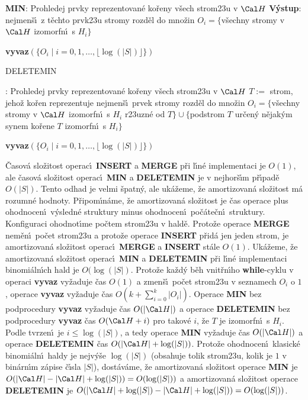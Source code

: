 {\bf MIN}:\newline 
Prohledej prvky reprezentovan\'e ko\v reny v\v sech 
strom\accent23u  
v $\Cal H$\newline 
{\bf V\'ystup}: nejmen\v s\'\i\ z t\v echto prvk\accent23u\newline 
stromy rozd\v el do mno\v zin $O_i=\{$v\v sechny stromy v 
$\Cal H$ izomorfn\'\i\ s $H_i\}$\newline 
{\bf vyvaz$(\{O_i\mid i=0,1,\dots,\lfloor\log(|S|)\rfloor \})$
\bigskip

DELETEMIN}:\newline 
Prohledej prvky reprezentovan\'e ko\v reny v\v sech 
strom\accent23u v $\Cal H$\newline 
$T:=$ strom, jeho\v z ko\v ren repre\-zentuje nejmen\v s\'\i\ 
prvek\newline 
stromy rozd\v el do mno\v zin $O_i=\{$v\v sechny stromy v 
$\Cal H$ izomorfn\'\i\ s $H_i$ r\accent23uzn\'e od $T\}\cup \{$podstrom $
T$ ur\v cen\'y n\v ejak\'ym synem ko\v rene $T$ 
izomorfn\'\i\ s $H_i\}$\newline 
{\bf vyvaz$(\{O_i\mid i=0,1,\dots,\lfloor\log(|S|)\rfloor \})$
\bigskip

\flushpar}\v Casov\'a slo\v zitost operac\'\i\ {\bf INSERT} a {\bf MER\-GE} p\v ri l\'\i n\'e 
implementaci je $O(1)$, ale \v casov\'a slo\v zitost operac\'\i\ {\bf MIN} a 
{\bf DELETEMIN} je v nejhor\v s\'\i m p\v r\'\i pad\v e $O(|S|)$. Tento odhad je 
velmi \v spatn\'y, ale uk\'a\v zeme, \v ze amortizovan\'a slo\v zitost m\'a rozumn\'e 
hodnoty. 
P\v ripom\'\i n\'ame, \v ze amortizovan\'a slo\v zi\-tost je \v cas operace plus 
ohodnocen\'\i\ v\'ysledn\'e struktury minus ohodnocen\'\i\ 
po\v c\'ate\v cn\'\i\ struktury. 
Konfiguraci ohodnot\'\i me po\v ctem strom\accent23u v 
hald\v e. 
Proto\v ze ope\-race {\bf MERGE} nem\v en\'\i\ po\v cet strom\accent23u a 
proto\v ze operace {\bf INSERT} p\v rid\'a jen jeden strom, je 
amortizovan\'a slo\v zitost operac\'\i\ {\bf MERGE} a {\bf INSERT} st\'ale $
O(1)$.
Uk\'a\v zeme, \v ze amortizovan\'a slo\v zitost operac\'\i\ {\bf MIN} a {\bf DELETEMIN }
p\v ri l\'\i n\'e implementaci binomi\'aln\'\i ch hald je $O(\log
(|S|)$. 
Proto\v ze ka\v zd\'y b\v eh 
vnit\v rn\'\i ho {\bf while}-cyklu v operaci {\bf vyvaz} vy\v zaduje \v cas $
O(1)$ 
a zmen\v s\'\i\ po\v cet strom\accent23u v seznamech $O_i$ o $1$, 
ope\-ra\-ce {\bf vyvaz} vy\v zaduje \v cas $O(k+\sum_{i=0}^k|O_i|
)$. Ope\-ra\-ce {\bf MIN}
bez podprocedury {\bf vyvaz} vy\v zaduje \v cas $O(|\Cal H|)$ a operace 
{\bf DELETEMIN} bez podprocedury {\bf vyvaz }\v cas $O(\Cal H+i)$ pro 
takov\'e $i$, \v ze $T$ je izomorfn\'\i\ s $H_i$. Podle tvrzen\'\i\ je $
i\le\log(|S|)$, a 
tedy ope\-ra\-ce {\bf MIN} vy\v zaduje \v cas $O(|\Cal H|)$ a ope\-race 
{\bf DELETEMIN }\v cas $O(|\Cal H|+\log(|S|))$. Proto\v ze  
ohodnocen\'\i\ klasick\'e binomi\'aln\'\i\ haldy je nejv\'y\v se $\log
(|S|)$ 
(obsahuje tolik strom\accent23u, kolik je $1$ v bin\'arn\'\i m z\'apise 
\v c\'\i sla $|S|$), dost\'av\'ame, \v ze amortizovan\'a slo\v zitost ope\-race {\bf MIN} je 
$O(|\Cal H|-|\Cal H|+\log(|S|))=O(\log(|S|))$ a amortizovan\'a slo\v zitost 
operace {\bf DELETEMIN} je $O(|\Cal H|+\log(|S|)-|\Cal H|+\log(|S
|))=O(\log(|S|))$.
\medskip

